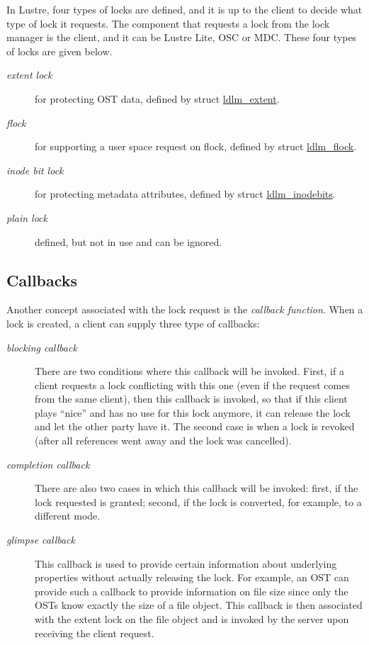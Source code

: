 In Lustre, four types of locks are defined, and it is up to the client to decide
what type of lock it requests.  The component that requests a lock from the
lock manager is the client, and it can be Lustre Lite, OSC or MDC. These four
types of locks are given below. 

\begin{description}

\item[\textit{extent lock}] for protecting OST data, defined by struct
\url{ldlm_extent}.

\item[\textit{flock}] for supporting a user space request on flock, defined by
struct \url{ldlm_flock}.

\item[\textit{inode bit lock}] for protecting metadata attributes, defined by
struct \url{ldlm_inodebits}.

\item[\textit{plain lock}] defined, but not in use and can be ignored.

\end{description}

\subsection{Callbacks}

Another concept associated with the lock request is the \textit{callback
function}. When a lock is created, a client can supply three type of callbacks:

\begin{description}

\item[\textit{blocking callback}] There are two conditions where this callback
will be invoked. First, if a client requests a lock conflicting with this one
(even if the request comes from the same client), then this callback is invoked,
so that if this client plays ``nice'' and has no use for this lock anymore, it
can release the lock and let the other party have it. The second case is when a
lock is revoked (after all references went away and the lock was cancelled).

\item[\textit{completion callback}] There are also two cases in which this callback will
be invoked: first, if the lock requested is granted; second, if the lock is
converted, for example, to a different mode.

\item[\textit{glimpse callback}] This callback is used to provide certain
information about underlying properties without actually releasing the lock.
For example, an OST can provide such a callback to provide information on file
size since only the OSTs know exactly the size of a file object. This callback
is then associated with the extent lock on the file object and is invoked by
the server upon receiving the client request.

\end{description}


